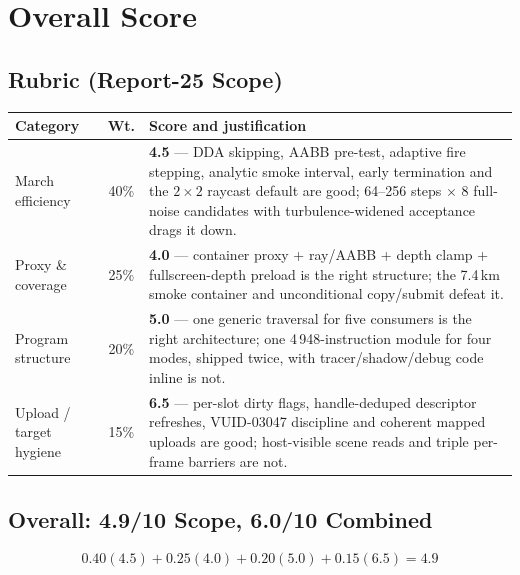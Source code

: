 \documentclass[11pt,a4paper]{article}
\begin{document}
\section{Overall Score}
\label{sec:score25}

\subsection{Rubric (Report-25 Scope)}

\begin{table}[h]
\centering
\small
\begin{tabular}{@{}lcp{7.2cm}@{}}
\toprule
\textbf{Category} & \textbf{Wt.} & \textbf{Score and justification} \\
\midrule
March efficiency & 40\% & \textbf{4.5} --- DDA skipping, AABB pre-test, adaptive
fire stepping, analytic smoke interval, early termination and the $2\times2$
raycast default are good; 64--256 steps $\times$ 8 full-noise candidates with
turbulence-widened acceptance drags it down. \\
Proxy \& coverage & 25\% & \textbf{4.0} --- container proxy + ray/AABB + depth
clamp + fullscreen-depth preload is the right structure; the 7.4\,km smoke
container and unconditional copy/submit defeat it. \\
Program structure & 20\% & \textbf{5.0} --- one generic traversal for five
consumers is the right architecture; one 4\,948-instruction module for four
modes, shipped twice, with tracer/shadow/debug code inline is not. \\
Upload / target hygiene & 15\% & \textbf{6.5} --- per-slot dirty flags,
handle-deduped descriptor refreshes, VUID-03047 discipline and coherent mapped
uploads are good; host-visible scene reads and triple per-frame barriers are
not. \\
\bottomrule
\end{tabular}
\end{table}

\subsection{Overall: 4.9/10 Scope, 6.0/10 Combined}

\begin{equation}
0.40(4.5) + 0.25(4.0) + 0.20(5.0) + 0.15(6.5) = \mathbf{4.9}
\end{equation}
\end{document}
